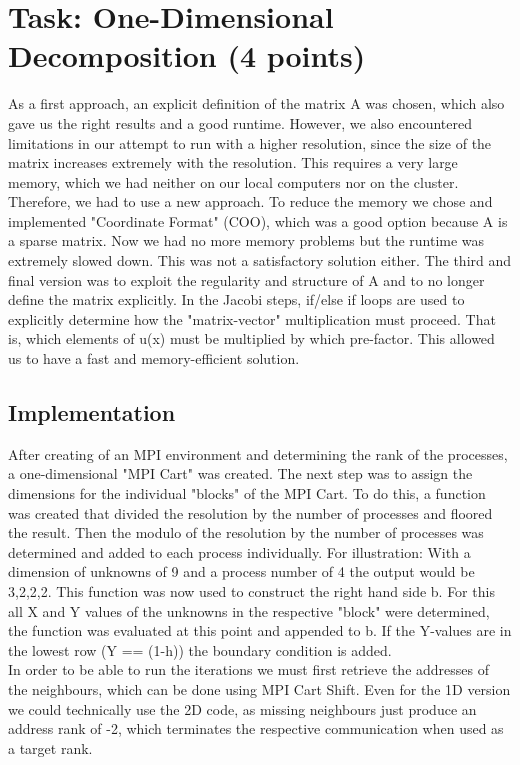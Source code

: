 \documentclass[10pt,a4paper]{article}
\begin{document}
\newpage
\section{Task: One-Dimensional Decomposition (4 points)}

As a first approach, an explicit definition of the matrix A was chosen, which also gave us the right results 
and a good runtime. However, we also encountered limitations in our attempt to run with a higher resolution, 
since the size of the matrix increases extremely with the resolution. This requires a very large memory, which we 
had neither on our local computers nor on the cluster. Therefore, we had to use a new approach. To reduce the memory 
we chose and implemented "Coordinate Format" (COO), which was a good option because A is a sparse matrix. Now we 
had no more memory problems but the runtime was extremely slowed down. This was not a satisfactory solution 
either. The third and final version was to exploit the regularity and structure of A and to no longer 
define the matrix explicitly. In the Jacobi steps, if/else if loops are used to explicitly determine how 
the "matrix-vector" multiplication must proceed. That is, which elements of u(x) must be multiplied by which 
pre-factor. This allowed us to have a fast and memory-efficient solution. 

\subsection{Implementation}


After creating of an MPI environment and determining the rank of the processes, a one-dimensional "MPI Cart" was created. The next step was to assign the dimensions for the individual "blocks" of the MPI Cart. To do this, a function was created that divided the resolution by the number of processes and floored the result.
Then the modulo of the resolution by the number of processes was determined and added to each process individually.
For illustration: With a dimension of unknowns of 9 and a process number of 4 the output would be 3,2,2,2.
This function was now used to construct the right hand side b. For this all X and Y values 
of the unknowns in the respective "block" were determined, the function was evaluated at this point and appended to b. If the Y-values are in the 
lowest row (Y == (1-h)) the boundary condition is added.
\\ 

In order to be able to run the iterations we must first retrieve the addresses of the neighbours, which 
can be done using MPI Cart Shift. Even for the 1D version we could technically use the 2D code, as 
missing  neighbours just produce an address rank of -2, which terminates the respective communication 
when used as a target rank.\\
\end{document}
